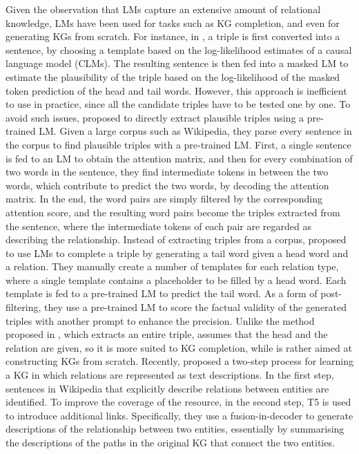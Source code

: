 \documentclass[3p]{elsarticle}
\begin{document}
{Given the observation that LMs capture an extensive amount of relational knowledge, LMs have been used for tasks such as KG completion, and even for generating KGs from scratch. For instance, in \cite{davison-etal-2019-commonsense}, a triple is first converted into a sentence, by choosing a template based on the log-likelihood estimates of a causal language model (CLMs). The resulting sentence is then fed into a masked LM to estimate the plausibility of the triple based on the log-likelihood of the masked token prediction of the head and tail words. However, this approach is inefficient to use in practice, since all the candidate triples have to be tested one by one. 
To avoid such issues, \cite{wang2020language} proposed to directly extract plausible triples using a pre-trained LM. Given a large corpus such as Wikipedia, they parse every sentence in the corpus to find plausible triples with a pre-trained LM. First, a single sentence is fed to an LM to obtain the attention matrix, and then for every combination of two words in the sentence, they find intermediate tokens in between the two words, which contribute to predict the two words, by decoding the attention matrix. In the end, the word pairs are simply filtered by the corresponding attention score, and the resulting word pairs become the triples extracted from the sentence, where the intermediate tokens of each pair are regarded as describing the relationship. 
Instead of extracting triples from a corpus, \cite{alivanistos2022prompting} proposed to use LMs to complete a triple by generating a tail word given a head word and a relation. They manually create a number of templates for each relation type, where a single template contains a placeholder to be filled by a head word. Each template is fed to a pre-trained LM to predict the tail word. As a form of post-filtering, they use a pre-trained LM to score the factual validity of the generated triples with another prompt to enhance the precision. Unlike the method proposed in \cite{wang2020language}, which extracts an entire triple, \cite{alivanistos2022prompting} assumes that the head and the relation are given, so it is more suited to KG completion, while \cite{wang2020language} is rather aimed at constructing KGs from scratch.
Recently, \cite{huang-etal-2022-deer} proposed a two-step process for learning a KG in which relations are represented as text descriptions. In the first step, sentences in Wikipedia that explicitly describe relations between entities are identified. To improve the coverage of the resource, in the second step, T5 \cite{2020t5} is used to introduce additional links. Specifically, they use a fusion-in-decoder \cite{izacard-grave-2021-leveraging} to generate descriptions of the relationship between two entities, essentially by summarising the descriptions of the paths in the original KG that connect the two entities.

}
\end{document}
